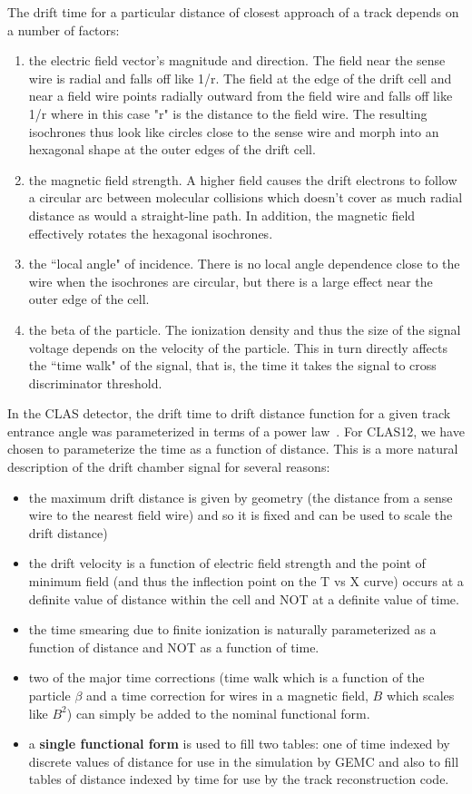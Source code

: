 \documentclass{article}
\begin{document}
The drift time for a particular distance of closest approach of a track 
depends on a number of factors:
\begin{enumerate}
\item the electric field vector's magnitude and direction.
The field near the sense wire is radial and falls off like 1/r.
The field at the edge of the drift cell and near a field wire points
   radially outward from the field wire and falls off like 1/r where in this case
   "r" is the distance to the field wire.  The resulting isochrones thus look like
   circles close to the sense wire and morph into an hexagonal shape at the outer
   edges of the drift cell.
\item the magnetic field strength.  A higher field causes the drift electrons to follow
   a circular arc between molecular collisions which doesn't cover as much radial distance
   as would a straight-line path.  In addition, the magnetic field effectively rotates the
   hexagonal isochrones.
\item the ``local angle" of incidence.  There is no local angle dependence close to the wire
   when the isochrones are circular, but there is a large effect near the outer edge
   of the cell.
\item the beta of the particle.  The ionization density and thus the size of the signal
   voltage depends on the velocity of the particle.  This in turn directly affects the
   ``time walk" of the signal, that is, the time it takes the signal to cross discriminator
   threshold.
\end{enumerate}

In the CLAS detector, the drift time to drift distance function for a given 
track entrance angle was parameterized in terms of a power law~\cite{mdm95}.
For CLAS12, we have chosen to parameterize the time as a function of
distance.  This is a more natural description of the drift chamber signal
for several reasons:
\begin{itemize}
\item the maximum drift distance is given by geometry (the distance from
a sense wire to the nearest field wire) and so it is fixed and can be used
to scale the drift distance)
\item the drift velocity is a function of electric field strength and the 
point of minimum field (and thus the inflection point on the T vs X curve) occurs at a
definite value of distance within the cell and NOT at a definite value of time.
\item the time smearing due to finite ionization is
naturally parameterized as a function of distance and NOT as a function of time.
\item two of the major time corrections (time walk which is a function of the
particle $\beta$ and a time correction for wires in a magnetic field, $B$ which
scales like $B^2$) can simply be added to the nominal functional form.
\item a {\bf single functional form} is used to fill two tables: one of time indexed by discrete
values of distance for use in the simulation by GEMC and also to fill tables
of distance indexed by time for use by the track reconstruction code.
\end{itemize}
\end{document}
